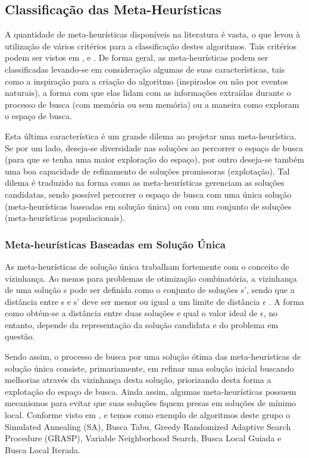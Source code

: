 \subsection{Classificação das Meta-Heurísticas}
\label{subsec:subc215}
A quantidade de meta-heurísticas disponíveis na literatura é vasta, o que levou à utilização de vários critérios para a classificação destes algoritmos. Tais critérios podem ser vistos em ,  e . De forma geral, as meta-heurísticas podem ser classificadas levando-se em consideração algumas de suas características, tais como a inspiração para a criação do algoritmo (inspirados ou não por eventos naturais), a forma com que elas lidam com as informações extraídas durante o processo de busca (com memória ou sem memória) ou a maneira como exploram o espaço de busca.

Esta última característica é um grande dilema ao projetar uma meta-heurística. Se por um lado, deseja-se diversidade nas soluções ao percorrer o espaço de busca (para que se tenha uma maior exploração do espaço), por outro deseja-se também uma boa capacidade de refinamento de soluções promissoras (explotação). Tal dilema é traduzido na forma como as meta-heurísticas gerenciam as soluções candidatas, sendo possível percorrer o espaço de busca com uma única solução (meta-heurísticas baseadas em solução única) ou com um conjunto de soluções (meta-heurísticas populacionais).

\subsubsection{Meta-heurísticas Baseadas em Solução Única}
\label{subsec:subc2151}
As meta-heurísticas de solução única trabalham fortemente com o conceito de vizinhança. Ao menos para problemas de otimização combinatória, a vizinhança de uma solução s pode ser definida como o conjunto de soluções s', sendo que a distância entre s e s' deve ser menor ou igual a um limite de distância $\epsilon$ \cite{Talbi2009}. A forma como obtém-se a distância entre duas soluções e qual o valor ideal de $\epsilon$, no entanto, depende da representação da solução candidata e do problema em questão.

Sendo assim, o processo de busca por uma solução ótima das meta-heurísticas de solução única consiste, primariamente, em refinar uma solução inicial buscando melhorias através da vizinhança desta solução, priorizando desta forma a explotação do espaço de busca. Ainda assim, algumas meta-heurísticas possuem mecanismos para evitar que suas soluções fiquem presas em soluções de mínimo local. Conforme visto em ,  e  temos como exemplo de algoritmos deste grupo o Simulated Annealing (SA), Busca Tabu, Greedy Randomized Adaptive Search Procedure (GRASP), Variable Neighborhood Search, Busca Local Guiada e Busca Local Iterada.

